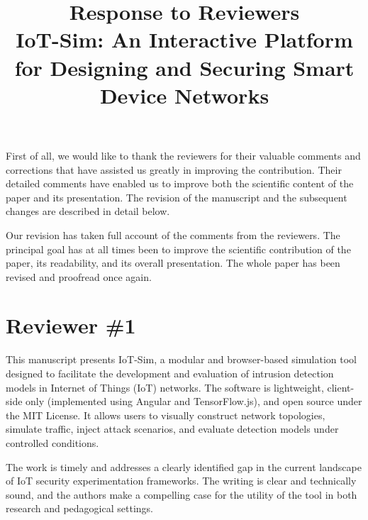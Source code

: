 \documentclass[12pt, a4paper]{article}
\title{
    Response to Reviewers \\
    \large IoT-Sim: An Interactive Platform for Designing and Securing Smart Device Networks
}
\date{}
\begin{document}
\maketitle

First of all, we would like to thank the reviewers for their valuable comments and corrections that have assisted us greatly in improving the contribution. Their detailed comments have enabled us to improve both the scientific content of the paper and its presentation. The revision of the manuscript and the subsequent changes are described in detail below. 

Our revision has taken full account of the comments from the reviewers. The principal goal has at all times been to improve the scientific contribution of the paper, its readability, and its overall presentation. The whole paper has been revised and proofread once again.

\newpage

\section*{Reviewer \#1}
This manuscript presents IoT-Sim, a modular and browser-based simulation tool designed to facilitate the development and evaluation of intrusion detection models in Internet of Things (IoT) networks. The software is lightweight, client-side only (implemented using Angular and TensorFlow.js), and open source under the MIT License. It allows users to visually construct network topologies, simulate traffic, inject attack scenarios, and evaluate detection models under controlled conditions.

The work is timely and addresses a clearly identified gap in the current landscape of IoT security experimentation frameworks. The writing is clear and technically sound, and the authors make a compelling case for the utility of the tool in both research and pedagogical settings.
\end{document}
